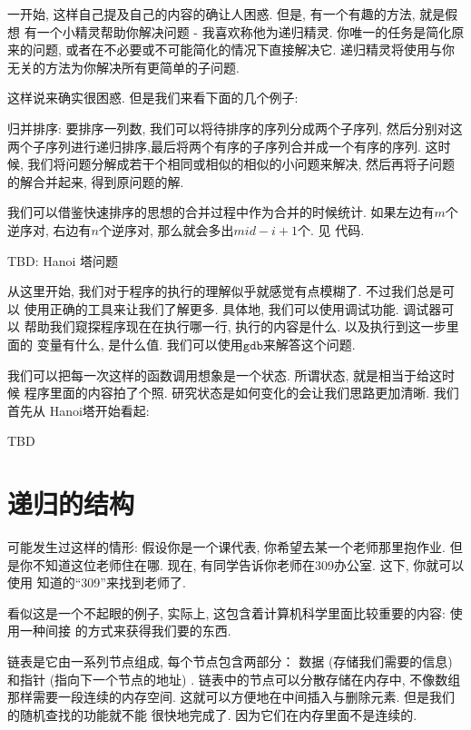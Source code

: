 一开始, 这样自己提及自己的内容的确让人困惑. 但是, 有一个有趣的方法, 就是假想
有一个小精灵帮助你解决问题 - 我喜欢称他为递归精灵. 
你唯一的任务是简化原来的问题, 或者在不必要或不可能简化的情况下直接解决它. 
递归精灵将使用与你无关的方法为你解决所有更简单的子问题. 

这样说来确实很困惑. 但是我们来看下面的几个例子: 

\begin{example}
    归并排序: 要排序一列数, 我们可以将待排序的序列分成两个子序列,
    然后分别对这两个子序列进行递归排序,最后将两个有序的子序列合并成一个有序的序列.
    这时候, 我们将问题分解成若干个相同或相似的相似的小问题来解决, 
    然后再将子问题的解合并起来, 得到原问题的解. 
\end{example}

 我们可以借鉴快速排序的思想的合并过程中作为合并的时候统计. 
如果左边有$m$个逆序对, 右边有$n$个逆序对, 那么就会多出$mid-i+1$个. 见
代码. 

\begin{example}
    TBD: Hanoi 塔问题
\end{example}


从这里开始, 我们对于程序的执行的理解似乎就感觉有点模糊了. 不过我们总是可以
使用正确的工具来让我们了解更多. 具体地, 我们可以使用调试功能. 调试器可以
帮助我们窥探程序现在在执行哪一行, 执行的内容是什么. 以及执行到这一步里面的
变量有什么, 是什么值. 我们可以使用$\texttt{gdb}$来解答这个问题. 

我们可以把每一次这样的函数调用想象是一个状态. 所谓状态, 就是相当于给这时候
程序里面的内容拍了个照. 研究状态是如何变化的会让我们思路更加清晰. 我们首先从
Hanoi塔开始看起: 

TBD

\section{递归的结构}

 可能发生过这样的情形: 假设你是一个课代表, 你希望去某一个老师那里抱作业. 
但是你不知道这位老师住在哪. 现在, 有同学告诉你老师在309办公室. 这下, 你就可以使用
知道的``309''来找到老师了. 

看似这是一个不起眼的例子, 实际上, 这包含着计算机科学里面比较重要的内容: 使用一种间接
的方式来获得我们要的东西. 

 链表是它由一系列节点组成, 每个节点包含两部分：
数据 (存储我们需要的信息) 和指针 (指向下一个节点的地址) . 
链表中的节点可以分散存储在内存中, 不像数组那样需要一段连续的内存空间. 
这就可以方便地在中间插入与删除元素. 但是我们的随机查找的功能就不能
很快地完成了. 因为它们在内存里面不是连续的. 

